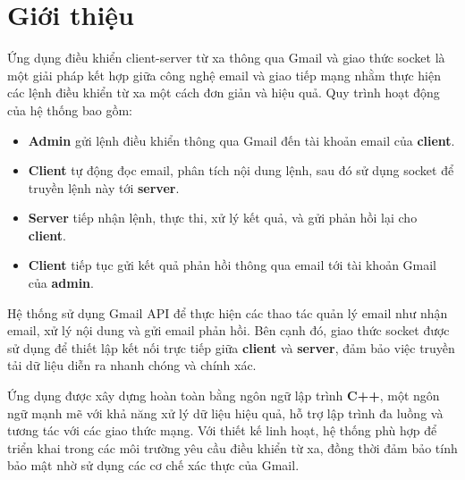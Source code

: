 \section{Giới thiệu}

Ứng dụng điều khiển client-server từ xa thông qua Gmail và giao thức socket là một giải pháp kết hợp giữa công nghệ email và giao tiếp mạng nhằm thực hiện các lệnh điều khiển từ xa một cách đơn giản và hiệu quả. Quy trình hoạt động của hệ thống bao gồm:

\begin{itemize}
    \item \textbf{Admin} gửi lệnh điều khiển thông qua Gmail đến tài khoản email của \textbf{client}.
    \item \textbf{Client} tự động đọc email, phân tích nội dung lệnh, sau đó sử dụng socket để truyền lệnh này tới \textbf{server}.
    \item \textbf{Server} tiếp nhận lệnh, thực thi, xử lý kết quả, và gửi phản hồi lại cho \textbf{client}.
    \item \textbf{Client} tiếp tục gửi kết quả phản hồi thông qua email tới tài khoản Gmail của \textbf{admin}.
\end{itemize}

Hệ thống sử dụng Gmail API để thực hiện các thao tác quản lý email như nhận email, xử lý nội dung và gửi email phản hồi. Bên cạnh đó, giao thức socket được sử dụng để thiết lập kết nối trực tiếp giữa \textbf{client} và \textbf{server}, đảm bảo việc truyền tải dữ liệu diễn ra nhanh chóng và chính xác.

Ứng dụng được xây dựng hoàn toàn bằng ngôn ngữ lập trình \textbf{C++}, một ngôn ngữ mạnh mẽ với khả năng xử lý dữ liệu hiệu quả, hỗ trợ lập trình đa luồng và tương tác với các giao thức mạng. Với thiết kế linh hoạt, hệ thống phù hợp để triển khai trong các môi trường yêu cầu điều khiển từ xa, đồng thời đảm bảo tính bảo mật nhờ sử dụng các cơ chế xác thực của Gmail.

\newpage